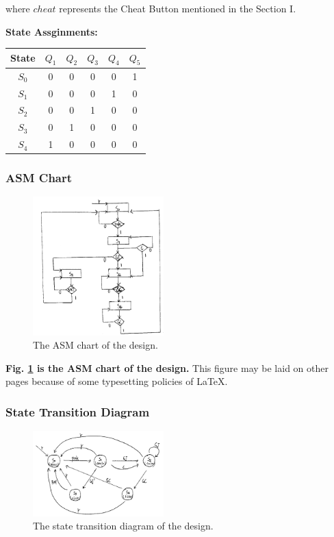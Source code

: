 \documentclass[conference]{IEEEtran}
\begin{document}
where $cheat$ represents the Cheat Button mentioned in the Section I.

\pagebreak

\textbf{State Assginments:}

\begin{center}
\begin{tabular}{|c|ccccc|}
    \hline
    State & $Q_1$ & $Q_2$ & $Q_3$ & $Q_4$ & $Q_5$ \\ 
    \hline
    $S_0$ & 0 & 0 & 0 & 0 & 1 \\
    $S_1$ & 0 & 0 & 0 & 1 & 0 \\
    $S_2$ & 0 & 0 & 1 & 0 & 0 \\
    $S_3$ & 0 & 1 & 0 & 0 & 0 \\
    $S_4$ & 1 & 0 & 0 & 0 & 0 \\
    \hline
\end{tabular}        
\end{center}


\subsubsection{ASM Chart}
\begin{figure}[h] %
    \centering
    \includegraphics[width=0.45\textwidth]{imageset/asm}
    \caption{The ASM chart of the design.}
    \label{fig_asm}
\end{figure}

\textbf{Fig. \ref{fig_asm} is the ASM chart of the design.} This figure may be laid on other pages because of some typesetting policies of \LaTeX.


\subsubsection{State Transition Diagram}
\begin{figure}[h] %
    \centering
    \includegraphics[width=0.45\textwidth]{imageset/state}
    \caption{The state transition diagram of the design.}
    \label{fig_state}
\end{figure}
\end{document}
